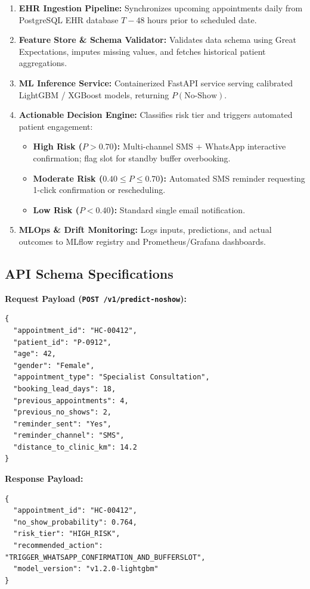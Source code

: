 \documentclass[11pt,a4paper]{article}
\begin{document}
\begin{enumerate}
    \item \textbf{EHR Ingestion Pipeline:} Synchronizes upcoming appointments daily from PostgreSQL EHR database $T-48$ hours prior to scheduled date.
    \item \textbf{Feature Store \& Schema Validator:} Validates data schema using Great Expectations, imputes missing values, and fetches historical patient aggregations.
    \item \textbf{ML Inference Service:} Containerized FastAPI service serving calibrated LightGBM / XGBoost models, returning $P(\text{No-Show})$.
    \item \textbf{Actionable Decision Engine:} Classifies risk tier and triggers automated patient engagement:
    \begin{itemize}
        \item \textbf{High Risk ($P > 0.70$):} Multi-channel SMS + WhatsApp interactive confirmation; flag slot for standby buffer overbooking.
        \item \textbf{Moderate Risk ($0.40 \le P \le 0.70$):} Automated SMS reminder requesting 1-click confirmation or rescheduling.
        \item \textbf{Low Risk ($P < 0.40$):} Standard single email notification.
    \end{itemize}
    \item \textbf{MLOps \& Drift Monitoring:} Logs inputs, predictions, and actual outcomes to MLflow registry and Prometheus/Grafana dashboards.
\end{enumerate}

\subsection{API Schema Specifications}
\textbf{Request Payload (\texttt{POST /v1/predict-noshow}):}
\begin{verbatim}
{
  "appointment_id": "HC-00412",
  "patient_id": "P-0912",
  "age": 42,
  "gender": "Female",
  "appointment_type": "Specialist Consultation",
  "booking_lead_days": 18,
  "previous_appointments": 4,
  "previous_no_shows": 2,
  "reminder_sent": "Yes",
  "reminder_channel": "SMS",
  "distance_to_clinic_km": 14.2
}
\end{verbatim}

\textbf{Response Payload:}
\begin{verbatim}
{
  "appointment_id": "HC-00412",
  "no_show_probability": 0.764,
  "risk_tier": "HIGH_RISK",
  "recommended_action": "TRIGGER_WHATSAPP_CONFIRMATION_AND_BUFFERSLOT",
  "model_version": "v1.2.0-lightgbm"
}
\end{verbatim}
\end{document}
